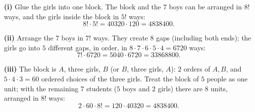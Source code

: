 \textbf{(i)} Glue the girls into one block. The block and the $7$ boys can be arranged in $8!$ ways, and the girls inside the block in $5!$ ways:
\[
8!\cdot5!=40320\cdot120=\boxed{4838400}.
\]

\textbf{(ii)} Arrange the $7$ boys in $7!$ ways. They create $8$ gaps (including both ends); the girls go into $5$ different gaps, in order, in $8\cdot7\cdot6\cdot5\cdot4=6720$ ways:
\[
7!\cdot6720=5040\cdot6720=\boxed{33868800}.
\]

\textbf{(iii)} The block is $A$, three girls, $B$ (or $B$, three girls, $A$): $2$ orders of $A,B$, and $5\cdot4\cdot3=60$ ordered choices of the three girls. Treat the block of $5$ people as one unit; with the remaining $7$ students ($5$ boys and $2$ girls) there are $8$ units, arranged in $8!$ ways:
\[
2\cdot60\cdot8!=120\cdot40320=\boxed{4838400}.
\]
